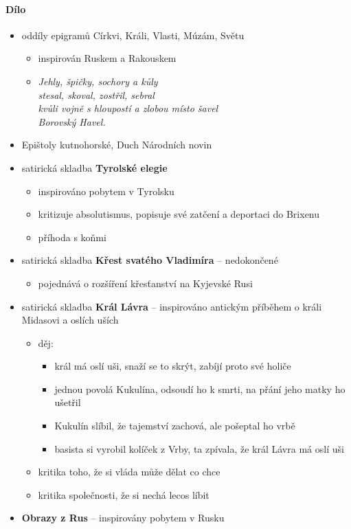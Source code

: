 \paragraph{Dílo}
\begin{itemize}
\item oddíly epigramů Církvi, Králi, Vlasti, Múzám, Světu
	\begin{itemize}
	\item inspirován Ruskem a Rakouskem
	\item \textit{Jehly, špičky, sochory a kůly\\
stesal, skoval, zostřil, sebral\\
kvůli vojně s hloupostí a zlobou místo šavel\\
Borovský Havel.}
	\end{itemize}
\item Epištoly kutnohorské, Duch Národních novin
\item satirická skladba \textbf{Tyrolské elegie}
	\begin{itemize}
	\item inspirováno pobytem v Tyrolsku
	\item kritizuje absolutismus, popisuje své zatčení a deportaci do Brixenu
	\item příhoda s koňmi
	\end{itemize}
\item satirická skladba \textbf{Křest svatého Vladimíra} -- nedokončené
	\begin{itemize}
	\item pojednává o rozšíření křesťanství na Kyjevské Rusi
	\end{itemize}
\item satirická skladba \textbf{Král Lávra} -- inspirováno antickým příběhem o králi Midasovi a oslích uších
	\begin{itemize}
	\item děj:
		\begin{itemize}
		\item král má oslí uši, snaží se to skrýt, zabíjí proto své holiče
		\item jednou povolá Kukulína, odsoudí ho k smrti, na přání jeho matky ho ušetřil
		\item Kukulín slíbil, že tajemství zachová, ale pošeptal ho vrbě
		\item basista si vyrobil kolíček z Vrby, ta zpívala, že král Lávra má oslí uši
		\end{itemize}
	\item kritika toho, že si vláda může dělat co chce
	\item kritika společnosti, že si nechá lecos líbit
	\end{itemize}
\item \textbf{Obrazy z Rus} -- inspirovány pobytem v Rusku
\end{itemize}

